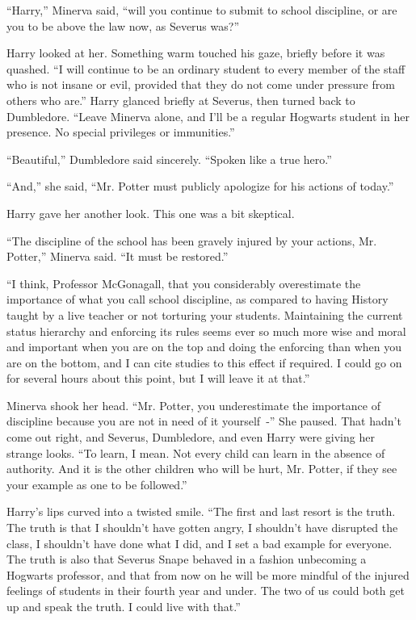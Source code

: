 ``Harry,'' Minerva said, ``will you continue to submit to school discipline, or are you to be above the law now, as Severus was?''

Harry looked at her. Something warm touched his gaze, briefly before it was quashed. ``I will continue to be an ordinary student to every member of the staff who is not insane or evil, provided that they do not come under pressure from others who are.'' Harry glanced briefly at Severus, then turned back to Dumbledore. ``Leave Minerva alone, and I'll be a regular Hogwarts student in her presence. No special privileges or immunities.''

``Beautiful,'' Dumbledore said sincerely. ``Spoken like a true hero.''

``And,'' she said, ``Mr. Potter must publicly apologize for his actions of today.''

Harry gave her another look. This one was a bit skeptical.

``The discipline of the school has been gravely injured by your actions, Mr. Potter,'' Minerva said. ``It must be restored.''

``I think, Professor McGonagall, that you considerably overestimate the importance of what you call school discipline, as compared to having History taught by a live teacher or not torturing your students. Maintaining the current status hierarchy and enforcing its rules seems ever so much more wise and moral and important when you are on the top and doing the enforcing than when you are on the bottom, and I can cite studies to this effect if required. I could go on for several hours about this point, but I will leave it at that.''

Minerva shook her head. ``Mr. Potter, you underestimate the importance of discipline because you are not in need of it yourself~-'' She paused. That hadn't come out right, and Severus, Dumbledore, and even Harry were giving her strange looks. ``To learn, I mean. Not every child can learn in the absence of authority. And it is the other children who will be hurt, Mr. Potter, if they see your example as one to be followed.''

Harry's lips curved into a twisted smile. ``The first and last resort is the truth. The truth is that I shouldn't have gotten angry, I shouldn't have disrupted the class, I shouldn't have done what I did, and I set a bad example for everyone. The truth is also that Severus Snape behaved in a fashion unbecoming a Hogwarts professor, and that from now on he will be more mindful of the injured feelings of students in their fourth year and under. The two of us could both get up and speak the truth. I could live with that.''

